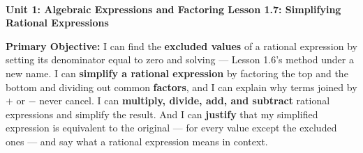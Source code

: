 \documentclass[10pt]{article}
\newcommand{\UnitNumberName}{Unit 1: Algebraic Expressions and Factoring \quad}
\newcommand{\LessonNumberName}{Lesson 1.7: Simplifying Rational Expressions}
\begin{document}
\begin{center}
    {\Large\bfseries \CourseName \\
    {\small\bfseries \UnitNumberName \LessonNumberName}}
\end{center}

\begin{tcolorbox}[colback=mist, colframe=royal, boxrule=0.9pt, arc=2mm,
    left=2mm, right=2mm, top=1.5mm, bottom=1.5mm]
    \textbf{Primary Objective:} I can find the \textbf{excluded values} of a rational expression by
    setting its denominator equal to zero and solving --- Lesson 1.6's method under a new name. I
    can \textbf{simplify a rational expression} by factoring the top and the bottom and dividing out
    common \textbf{factors}, and I can explain why terms joined by $+$ or $-$ never cancel. I can
    \textbf{multiply, divide, add, and subtract} rational expressions and simplify the result. And I
    can \textbf{justify} that my simplified expression is equivalent to the original --- for every
    value except the excluded ones --- and say what a rational expression means in context.
\end{tcolorbox}
\end{document}
